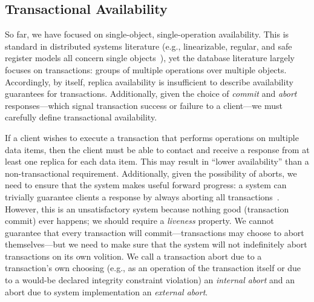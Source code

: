 

\subsection{Transactional Availability}

So far, we have focused on single-object, single-operation
availability. This is standard in distributed systems literature
(e.g., linearizable, regular, and safe register models all concern
single objects~\cite{herlihy-art}), yet the database literature
largely focuses on transactions: groups of multiple operations over
multiple objects. Accordingly, by itself, replica availability is
insufficient to describe availability guarantees for
transactions. Additionally, given the choice of \textit{commit} and
\textit{abort} responses---which signal transaction success or failure
to a client---we must carefully define transactional availability.

If a client wishes to execute a transaction that performs operations
on multiple data items, then the client must be able to contact and
receive a response from at least one replica for each data item. This
may result in ``lower availability'' than a non-transactional
requirement. Additionally, given the possibility of aborts, we need to
ensure that the system makes useful forward progress: a system can
trivially guarantee clients a response by always aborting all
transactions~\cite{transaction-liveness}. However, this is an
unsatisfactory system because nothing good (transaction commit) ever
happens; we should require a \textit{liveness} property. We
cannot guarantee that every transaction will commit---transactions may
choose to abort themselves---but we need to make sure that the system
will not indefinitely abort transactions on its own volition. We call
a transaction abort due to a transaction's own choosing (e.g., as an
operation of the transaction itself or due to a would-be declared
integrity constraint violation) an \textit{internal abort} and an
abort due to system implementation an \textit{external abort}.


